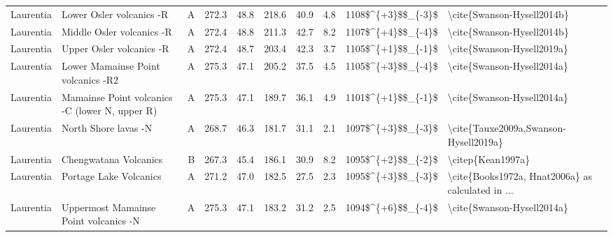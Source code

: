 \begin{longtable}{p{1 in}p{1 in}rrrrrrr}
                     Laurentia &                           Lower Osler volcanics -R &      A &     272.3 &      48.8 & 218.6 &  40.9 &       4.8 &     1108\$\textasciicircum \{+3\}\$\$\_\{-3\}\$ &                         \textbackslash cite\{Swanson-Hysell2014b\} \\
                     Laurentia &                          Middle Osler volcanics -R &      A &     272.4 &      48.8 & 211.3 &  42.7 &       8.2 &     1107\$\textasciicircum \{+4\}\$\$\_\{-4\}\$ &                         \textbackslash cite\{Swanson-Hysell2014b\} \\
                     Laurentia &                           Upper Osler volcanics -R &      A &     272.4 &      48.7 & 203.4 &  42.3 &       3.7 &     1105\$\textasciicircum \{+1\}\$\$\_\{-1\}\$ &                         \textbackslash cite\{Swanson-Hysell2019a\} \\
                     Laurentia &                 Lower Mamainse Point volcanics -R2 &      A &     275.3 &      47.1 & 205.2 &  37.5 &       4.5 &     1105\$\textasciicircum \{+3\}\$\$\_\{-4\}\$ &                         \textbackslash cite\{Swanson-Hysell2014a\} \\
                     Laurentia &     Mamainse Point volcanics -C (lower N, upper R) &      A &     275.3 &      47.1 & 189.7 &  36.1 &       4.9 &     1101\$\textasciicircum \{+1\}\$\$\_\{-1\}\$ &                         \textbackslash cite\{Swanson-Hysell2014a\} \\
                     Laurentia &                               North Shore lavas -N &      A &     268.7 &      46.3 & 181.7 &  31.1 &       2.1 &     1097\$\textasciicircum \{+3\}\$\$\_\{-3\}\$ &              \textbackslash cite\{Tauxe2009a,Swanson-Hysell2019a\} \\
                     Laurentia &                              Chengwatana Volcanics &      B &     267.3 &      45.4 & 186.1 &  30.9 &       8.2 &     1095\$\textasciicircum \{+2\}\$\$\_\{-2\}\$ &                                  \textbackslash citep\{Kean1997a\} \\
                     Laurentia &                             Portage Lake Volcanics &      A &     271.2 &      47.0 & 182.5 &  27.5 &       2.3 &     1095\$\textasciicircum \{+3\}\$\$\_\{-3\}\$ &  \textbackslash cite\{Books1972a, Hnat2006a\} as calculated in ... \\
                     Laurentia &              Uppermost Mamainse Point volcanics -N &      A &     275.3 &      47.1 & 183.2 &  31.2 &       2.5 &     1094\$\textasciicircum \{+6\}\$\$\_\{-4\}\$ &                         \textbackslash cite\{Swanson-Hysell2014a\} \\

\end{longtable}
